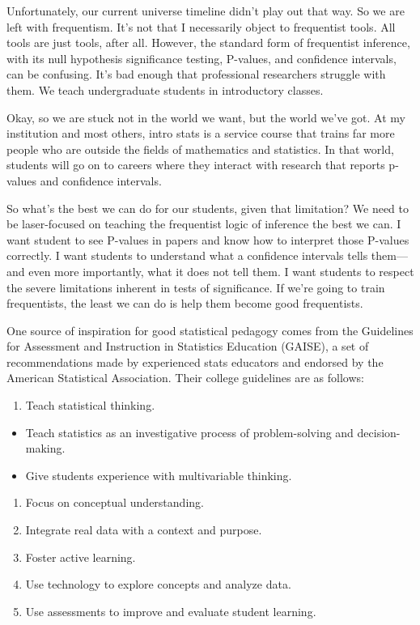 \documentclass[
]{book}
\providecommand{\tightlist}{%
  \setlength{\itemsep}{0pt}\setlength{\parskip}{0pt}}
\begin{document}
Unfortunately, our current universe timeline didn't play out that way. So we are left with frequentism. It's not that I necessarily object to frequentist tools. All tools are just tools, after all. However, the standard form of frequentist inference, with its null hypothesis significance testing, P-values, and confidence intervals, can be confusing. It's bad enough that professional researchers struggle with them. We teach undergraduate students in introductory classes.

Okay, so we are stuck not in the world we want, but the world we've got. At my institution and most others, intro stats is a service course that trains far more people who are outside the fields of mathematics and statistics. In that world, students will go on to careers where they interact with research that reports p-values and confidence intervals.

So what's the best we can do for our students, given that limitation? We need to be laser-focused on teaching the frequentist logic of inference the best we can. I want student to see P-values in papers and know how to interpret those P-values correctly. I want students to understand what a confidence intervals tells them---and even more importantly, what it does not tell them. I want students to respect the severe limitations inherent in tests of significance. If we're going to train frequentists, the least we can do is help them become good frequentists.

One source of inspiration for good statistical pedagogy comes from the Guidelines for Assessment and Instruction in Statistics Education (GAISE), a set of recommendations made by experienced stats educators and endorsed by the American Statistical Association. Their college guidelines are as follows:

\begin{enumerate}
\def\labelenumi{\arabic{enumi}.}
\tightlist
\item
  Teach statistical thinking.
\end{enumerate}

\begin{itemize}
\tightlist
\item
  Teach statistics as an investigative process of problem-solving and decision-making.
\item
  Give students experience with multivariable thinking.
\end{itemize}

\begin{enumerate}
\def\labelenumi{\arabic{enumi}.}
\setcounter{enumi}{1}
\tightlist
\item
  Focus on conceptual understanding.
\item
  Integrate real data with a context and purpose.
\item
  Foster active learning.
\item
  Use technology to explore concepts and analyze data.
\item
  Use assessments to improve and evaluate student learning.
\end{enumerate}
\end{document}
